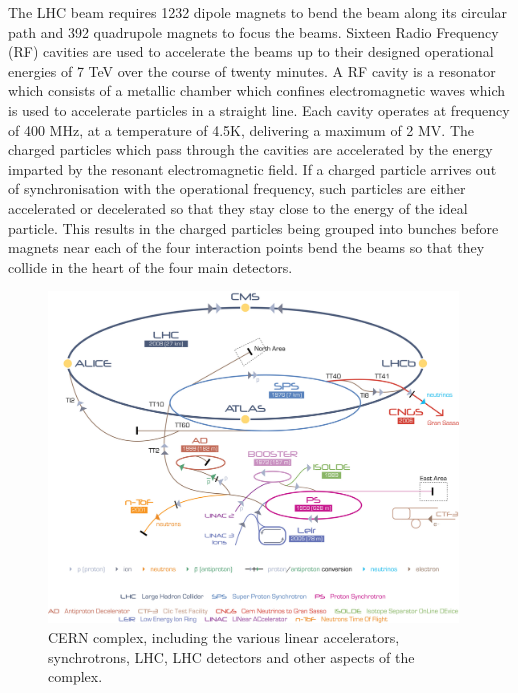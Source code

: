 The LHC beam requires 1232 dipole magnets to bend the beam along its circular path and 392 quadrupole magnets to focus the beams. 
Sixteen Radio Frequency (RF) cavities are used to accelerate the beams up to their designed operational energies of 7 TeV over the course of twenty minutes. 
A RF cavity is a resonator which consists of a metallic chamber which confines electromagnetic waves which is used to accelerate particles in a straight line. 
Each cavity operates at frequency of 400 MHz, at a temperature of 4.5K, delivering a maximum of 2 MV. 
The charged particles which pass through the cavities are accelerated by the energy imparted by the resonant electromagnetic field. 
If a charged particle arrives out of synchronisation with the operational frequency, such particles are either accelerated or decelerated so that they stay close to the energy of the ideal particle. 
This results in the charged particles being grouped into bunches before magnets near each of the four interaction points bend the beams so that they collide in the heart of the four main detectors\cite{Brüning:782076}. 

\begin{figure}[htbp]
\begin{center}
\includegraphics[width=0.97\textwidth]{figs/lhc/Cern-Accelerator-Complex.jpg}
\caption{CERN complex, including the various linear accelerators, synchrotrons, LHC, LHC detectors and other aspects of the complex.}
\label{fig:cern-accelerator-complex}
\end{center}
\end{figure}
